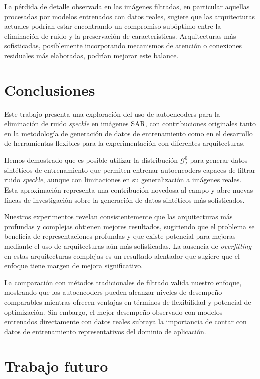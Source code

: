 La pérdida de detalle observada en las imágenes filtradas, en particular aquellas procesadas por modelos entrenados con datos reales, sugiere que las arquitecturas actuales podrían estar encontrando un compromiso subóptimo entre la eliminación de ruido y la preservación de características. Arquitecturas más sofisticadas, posiblemente incorporando mecanismos de atención o conexiones residuales más elaboradas, podrían mejorar este balance.

\section{Conclusiones}

Este trabajo presenta una exploración del uso de autoencoders para la eliminación de ruido \emph{speckle} en imágenes SAR, con contribuciones originales tanto en la metodología de generación de datos de entrenamiento como en el desarrollo de herramientas flexibles para la experimentación con diferentes arquitecturas.

Hemos demostrado que es posible utilizar la distribución $\mathcal{G}_I^0$ para generar datos sintéticos de entrenamiento que permiten entrenar autoencoders capaces de filtrar ruido \emph{speckle}, aunque con limitaciones en su generalización a imágenes reales. Esta aproximación representa una contribución novedosa al campo y abre nuevas líneas de investigación sobre la generación de datos sintéticos más sofisticados.

Nuestros experimentos revelan consistentemente que las arquitecturas más profundas y complejas obtienen mejores resultados, sugiriendo que el problema se beneficia de representaciones profundas y que existe potencial para mejoras mediante el uso de arquitecturas aún más sofisticadas. La ausencia de \emph{overfitting} en estas arquitecturas complejas es un resultado alentador que sugiere que el enfoque tiene margen de mejora significativo.

La comparación con métodos tradicionales de filtrado valida nuestro enfoque, mostrando que los autoencoders pueden alcanzar niveles de desempeño comparables mientras ofrecen ventajas en términos de flexibilidad y potencial de optimización. Sin embargo, el mejor desempeño observado con modelos entrenados directamente con datos reales subraya la importancia de contar con datos de entrenamiento representativos del dominio de aplicación.

\section{Trabajo futuro}

